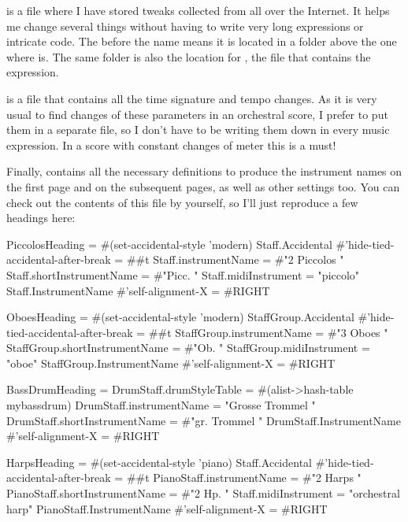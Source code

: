 \documentclass[../../LilyPond-Tutorials]{subfiles}
\begin{document}
 is a file where I have stored tweaks collected from all over the Internet.
It helps me change several things without having to write very long expressions or intricate code.
The  before the name means it is located in a folder above the one where  is.
The same folder is also the location for , the file that contains the  expression. 

 is a file that contains all the time signature and tempo changes.
As it is very usual to find changes of these parameters in an orchestral score, I prefer to put them in a separate file, so I don't have to be writing them down in every music expression.
In a score with constant changes of meter this is a must!

Finally,  contains all the necessary definitions to produce the instrument names on the first page and on the subsequent pages, as well as other settings too.
You can check out the contents of this file by yourself, so I'll just reproduce a few headings here:

\begin{lilypondcode}
PiccolosHeading = {
       #(set-accidental-style 'modern)
       \override Staff.Accidental #'hide-tied-accidental-after-break = ##t
       \set Staff.instrumentName = #"2 Piccolos "
       \set Staff.shortInstrumentName = #"Picc. "
       \set Staff.midiInstrument = "piccolo"
       \override Staff.InstrumentName #'self-alignment-X = #RIGHT
}

OboesHeading = {
       #(set-accidental-style 'modern)
       \override StaffGroup.Accidental #'hide-tied-accidental-after-break = ##t
       \set StaffGroup.instrumentName = #"3 Oboes "
       \set StaffGroup.shortInstrumentName = #"Ob. "
       \set StaffGroup.midiInstrument = "oboe"
       \override StaffGroup.InstrumentName #'self-alignment-X = #RIGHT
}

BassDrumHeading = {
       \set DrumStaff.drumStyleTable = #(alist->hash-table mybassdrum)
       \set DrumStaff.instrumentName = "Grosse Trommel "
       \set DrumStaff.shortInstrumentName = #"gr. Trommel "
       \override DrumStaff.InstrumentName #'self-alignment-X = #RIGHT
}

HarpsHeading = {
       #(set-accidental-style 'piano)
       \override Staff.Accidental #'hide-tied-accidental-after-break = ##t
       \set PianoStaff.instrumentName = #"2 Harps "
       \set PianoStaff.shortInstrumentName = #"2 Hp. "
       \set Staff.midiInstrument = "orchestral harp"
       \override PianoStaff.InstrumentName #'self-alignment-X = #RIGHT
}\end{lilypondcode}
\end{document}
